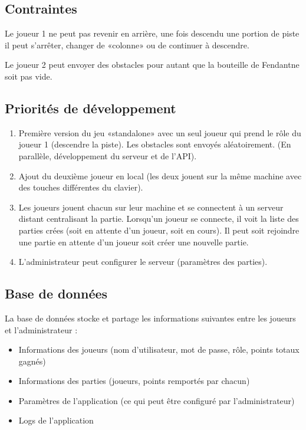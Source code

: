 \documentclass[a4paper,11pt]{article}
\begin{document}
	\subsection{Contraintes}
	Le joueur 1 ne peut pas revenir en arrière, une fois descendu une portion de piste il peut s'arrêter, changer de «colonne» ou de continuer à descendre. \par

	Le joueur 2 peut envoyer des obstacles pour autant que la bouteille de Fendant\texttrademark ne soit pas vide.

	\subsection{Priorités de développement}

	\begin{enumerate}
		\item Première version du jeu «standalone» avec un seul joueur qui prend le rôle du joueur 1 (descendre la piste). Les obstacles sont envoyés aléatoirement. (En parallèle, développement du serveur et de l'API).
		\item Ajout du deuxième joueur en local (les deux jouent sur la même machine avec des touches différentes du clavier).
		\item Les joueurs jouent chacun sur leur machine et se connectent à un serveur distant centralisant la partie. Lorsqu'un joueur se connecte, il voit la liste des parties crées (soit en attente d'un joueur, soit en cours). Il peut soit rejoindre une partie en attente d'un joueur soit créer une nouvelle partie.
		\item L'administrateur peut configurer le serveur (paramètres des parties).
	\end{enumerate}

	\subsection{Base de données}
	La base de données stocke et partage les informations suivantes entre les joueurs et l'administrateur :
	\begin{itemize}
		\item Informations des joueurs (nom d'utilisateur, mot de passe, rôle, points totaux gagnés)
		\item Informations des parties (joueurs, points remportés par chacun)
		\item Paramètres de l'application (ce qui peut être configuré par l'administrateur)
		\item Logs de l'application
	\end{itemize}
\end{document}
